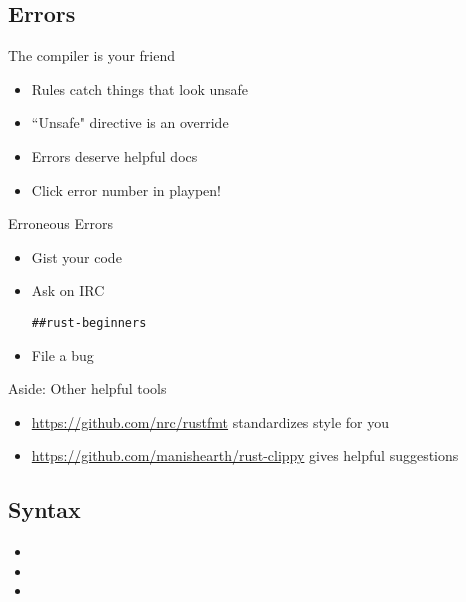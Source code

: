 \documentclass[50pt]{beamer}
\begin{document}
\subsection{Errors}

    \begin{frame}
        The compiler is your friend
        \begin{itemize}
            \item Rules catch things that look unsafe
            \item ``Unsafe" directive is an override
            \item Errors deserve helpful docs
            \item Click error number in playpen!
        \end{itemize}
    \end{frame}

    \begin{frame}
        Erroneous Errors
        \begin{itemize}
            \item Gist your code
            \item Ask on IRC \begin{verbatim}##rust-beginners\end{verbatim}
            \item File a bug
        \end{itemize}
    \end{frame}

    \begin{frame}
        Aside: Other helpful tools
        \begin{itemize}
            \item \url{https://github.com/nrc/rustfmt} standardizes style for you
            \item \url{https://github.com/manishearth/rust-clippy} gives helpful suggestions
        \end{itemize}
    \end{frame}

\subsection{Syntax}

    \begin{frame}
        \begin{itemize}
            \item
            \item
            \item
        \end{itemize}
    \end{frame}
\end{document}
